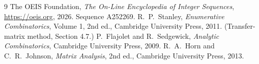 \documentclass[11pt,a4paper]{article}
\theoremstyle{plain}
\theoremstyle{definition}
\begin{document}
\begin{thebibliography}{9}
 The OEIS Foundation, \emph{The On-Line Encyclopedia of Integer
Sequences}, \url{https://oeis.org}, 2026. Sequence A252269.
 R.~P.~Stanley, \emph{Enumerative Combinatorics}, Volume 1, 2nd ed.,
Cambridge University Press, 2011. (Transfer-matrix method, Section 4.7.)
 P.~Flajolet and R.~Sedgewick, \emph{Analytic Combinatorics}, Cambridge
University Press, 2009.
 R.~A.~Horn and C.~R.~Johnson, \emph{Matrix Analysis}, 2nd ed., Cambridge
University Press, 2013.
\end{thebibliography}
\end{document}
